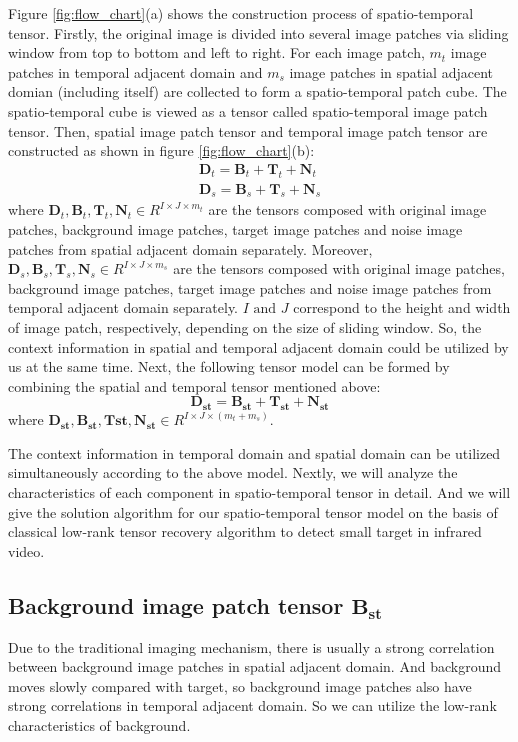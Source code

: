 \documentclass[journal]{IEEEtran}
\begin{document}
Figure \ref{fig:flow_chart}(a) shows the construction process of spatio-temporal tensor. Firstly, the original image is divided into several image patches via sliding window from top to bottom and left to right. For each image patch, $m_t$ image patches in temporal adjacent domain and $m_s$ image patches in spatial adjacent domian (including itself) are collected to form a spatio-temporal patch cube. The spatio-temporal cube is viewed as a tensor called spatio-temporal image patch tensor. Then, spatial image patch tensor and temporal image patch tensor are constructed as shown in figure \ref{fig:flow_chart}(b):
\begin{equation}
  \begin{split}
    \bm{D}_t = \bm{B}_t + \bm{T}_t + \bm{N}_t \\
    \bm{D}_s = \bm{B}_s + \bm{T}_s + \bm{N}_s
  \end{split}
\end{equation}
where $\bm{D}_t,\bm{B}_t,\bm{T}_t,\bm{N}_t \in R^{{I}\times{J}\times{m_t}}$ are the tensors composed with original image patches, background image patches, target image patches and noise image patches from spatial adjacent domain separately. Moreover, $\bm{D}_s,\bm{B}_s,\bm{T}_s,\bm{N}_s \in R^{{I}\times{J}\times{m_s}}$ are the tensors composed with original image patches, background image patches, target image patches and noise image patches from temporal adjacent domain separately. $I\text{ and }J$ correspond to the height and width of image patch, respectively, depending on the size of sliding window. So, the context information in spatial and temporal adjacent domain could be utilized by us at the same time. Next, the following tensor model can be formed by combining the spatial and temporal tensor mentioned above:
\begin{equation}
  \bm{D_{st}}=\bm{B_{st}}+\bm{T_{st}}+\bm{N_{st}}
  \label{eq3}
\end{equation}
where $\bm{D_{st}},\bm{B_{st}},\bm{T{st}},\bm{N_{st}} \in R^{{I}\times{J}\times{(m_t+m_s)}}$.

The context information in temporal domain and spatial domain can be utilized simultaneously according to the above model. Nextly, we will analyze the characteristics of each component in spatio-temporal tensor in detail. And we will give the solution algorithm for our spatio-temporal tensor model on the basis of classical low-rank tensor recovery algorithm to detect small target in infrared video.

\subsection{Background image patch tensor $\mathbf{B_{st}}$ }
Due to the traditional imaging mechanism, there is usually a strong correlation between background image patches in spatial adjacent domain. And background moves slowly compared with target, so background image patches also have strong correlations in temporal adjacent domain. So we can utilize the low-rank characteristics of background. 
\end{document}
